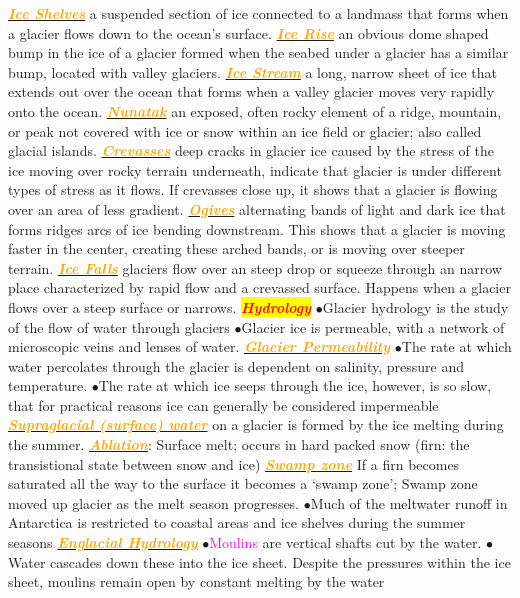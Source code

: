 \documentclass{article}
\newcommand{\ddd}{$\bullet$}
\newcommand{\red}[1]{\textcolor{red}{#1}}
\newcommand{\pink}[1]{\textcolor{magenta}{#1}}
\newcommand{\orange}[1]{\textcolor{orange}{#1}}
\newcommand{\mysection}[1]{\colorbox{yellow}{\textbf{\textit{\red{#1}}}}}
\newcommand{\mysub}[1]{\underline{\textbf{{\textit{\orange{#1}}}}}}
\newcommand{\vocab}[1]{{\pink{#1}}}
\begin{document}
\begin{multicols*}{4}
		\mysub{Ice Shelves} a suspended section of ice connected to a landmass that forms when a glacier flows down to the ocean’s surface.
		\mysub{Ice Rise} an obvious dome shaped bump in the ice of a glacier formed when the seabed under a glacier has a similar bump, located with valley glaciers.
		\mysub{Ice Stream} a long, narrow sheet of ice that extends out over the ocean that forms when a valley glacier moves very rapidly onto the ocean.
		\mysub{Nunatak} an exposed, often rocky element of a ridge, mountain, or peak not covered with ice or snow within an ice field or glacier; also called glacial islands.
		\mysub{Crevasses} deep cracks in glacier ice caused by the stress of the ice moving over rocky terrain underneath, indicate that glacier is under different types of stress as it flows. If crevasses close up, it shows that a glacier is flowing over an area of less gradient. 
		\mysub{Ogives} alternating bands of light and dark ice that forms ridges arcs of ice bending downstream. This shows that a glacier is moving faster in the center, creating these arched bands, or is moving over steeper terrain.
		\mysub{Ice Falls} glaciers flow over an steep drop or squeeze through an narrow place characterized by rapid flow and a crevassed surface. Happens when a glacier flows over a steep surface or narrows.
	    \mysection{Hydrology}
	        \ddd Glacier hydrology is the study of the flow of water through glaciers
            \ddd Glacier ice is permeable, with a network of microscopic veins and lenses of water.
            \mysub{Glacier Permeability} 
                \ddd The rate at which water percolates through the glacier is dependent on salinity, pressure and temperature. 
                \ddd  The rate at which ice seeps through the ice, however, is so slow, that for practical reasons ice can generally be considered impermeable
            \mysub{Supraglacial (surface) water} on a glacier is formed by the ice melting during the summer.
            \mysub{Ablation}: Surface melt; occurs in hard packed snow (firn: the transistional state between snow and ice)
            \mysub{Swamp zone} If a firn becomes saturated all the way to the surface it becomes a ‘swamp zone’; Swamp zone moved up glacier as the melt season progresses.
            \ddd Much of the meltwater runoff in Antarctica is restricted to coastal areas and ice shelves during the summer seasons
            \mysub{Englacial Hydrology}
                \ddd \vocab{Moulins} are vertical shafts cut by the water.
                \ddd Water cascades down these into the ice sheet. Despite the pressures within the ice sheet, moulins remain open by constant melting by the water

\end{multicols*}
\end{document}
